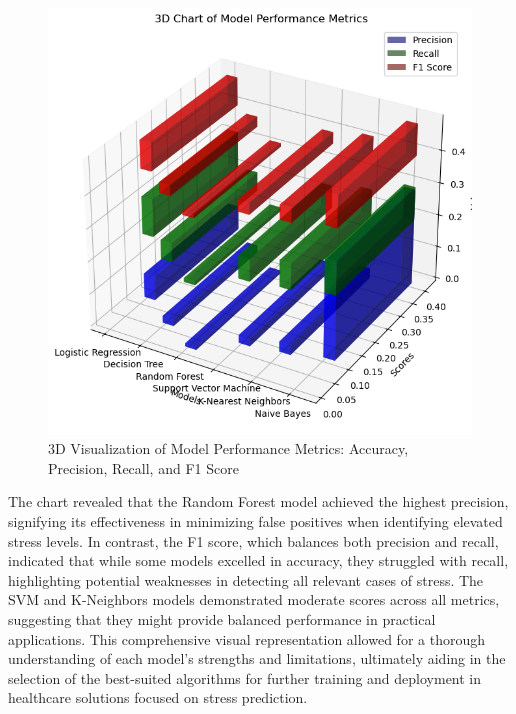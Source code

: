 \documentclass[runningheads]{llncs}
\begin{document}
\begin{enumerate}
\newpage
\begin{figure}
    \centering
    \includegraphics[width=1.0\linewidth]{modeling 7.png}
    \caption{3D Visualization of Model Performance Metrics: Accuracy, Precision, Recall, and F1 Score} 
    \label{fig:enter-label}
\end{figure}

The chart revealed that the Random Forest model achieved the highest precision, signifying its effectiveness in minimizing false positives when identifying elevated stress levels. In contrast, the F1 score, which balances both precision and recall, indicated that while some models excelled in accuracy, they struggled with recall, highlighting potential weaknesses in detecting all relevant cases of stress. The SVM and K-Neighbors models demonstrated moderate scores across all metrics, suggesting that they might provide balanced performance in practical applications. This comprehensive visual representation allowed for a thorough understanding of each model's strengths and limitations, ultimately aiding in the selection of the best-suited algorithms for further training and deployment in healthcare solutions focused on stress prediction.


\end{enumerate}
\end{document}

